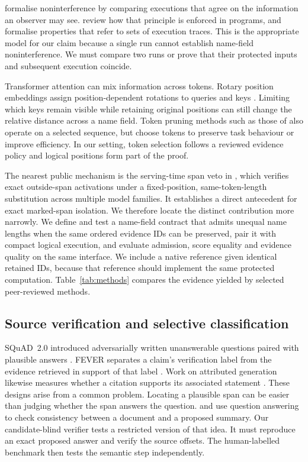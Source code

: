 \citet{goguen1982} formalise noninterference by comparing executions that agree on the information an observer may see. \citet{sabelfeld2003} review how that principle is enforced in programs, and \citet{clarkson2010} formalise properties that refer to sets of execution traces. This is the appropriate model for our claim because a single run cannot establish name-field noninterference. We must compare two runs or prove that their protected inputs and subsequent execution coincide.

Transformer attention \citep{vaswani2017} can mix information across tokens. Rotary position embeddings assign position-dependent rotations to queries and keys \citep{su2024}. Limiting which keys remain visible while retaining original positions can still change the relative distance across a name field. Token pruning methods such as those of \citet{kim2022} also operate on a selected sequence, but choose tokens to preserve task behaviour or improve efficiency. In our setting, token selection follows a reviewed evidence policy and logical positions form part of the proof.

The nearest public mechanism is the serving-time span veto in \citet[Section III]{russinovich2026}, which verifies exact outside-span activations under a fixed-position, same-token-length substitution across multiple model families. It establishes a direct antecedent for exact marked-span isolation. We therefore locate the distinct contribution more narrowly. We define and test a name-field contract that admits unequal name lengths when the same ordered evidence IDs can be preserved, pair it with compact logical execution, and evaluate admission, score equality and evidence quality on the same interface. We include a native reference given identical retained IDs, because that reference should implement the same protected computation. Table~\ref{tab:methods} compares the evidence yielded by selected peer-reviewed methods.



\subsection{Source verification and selective classification}

SQuAD~2.0 introduced adversarially written unanswerable questions paired with plausible answers \citep{rajpurkar2018}. FEVER separates a claim's verification label from the evidence retrieved in support of that label \citep{thorne2018}. Work on attributed generation likewise measures whether a citation supports its associated statement \citep{gao2023}. These designs arise from a common problem. Locating a plausible span can be easier than judging whether the span answers the question. \citet{wang2020} and \citet{fabbri2022} use question answering to check consistency between a document and a proposed summary. Our candidate-blind verifier tests a restricted version of that idea. It must reproduce an exact proposed answer and verify the source offsets. The human-labelled benchmark then tests the semantic step independently.


